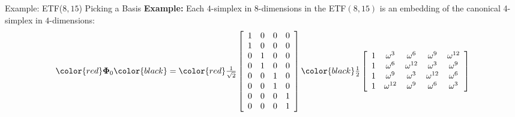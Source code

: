 \documentclass[12pt]{beamer}
\newcommand{\bfPhi}{\boldsymbol{\Phi}}
\begin{document}
\begin{frame}{Example: ETF($8,15$) Picking a Basis}
\textbf{Example:} Each $4$-simplex in $8$-dimensions in the ETF$(8,15)$ is an embedding of the canonical 4-simplex in $4$-dimensions:
\begin{equation*}
\color{red}
\bfPhi_0
\color{black}
=
\color{red}
\tfrac{1}{\sqrt{2}}\left[\begin{array}{cccc}
	1 & 0 & 0 & 0\\
	1 & 0 & 0 & 0\\
	0 & 1 & 0 & 0\\
	0 & 1 & 0 & 0\\
	0 & 0 & 1 & 0\\
	0 & 0 & 1 & 0\\
	0 & 0 & 0 & 1\\
	0 & 0 & 0 & 1
	\end{array}\right]
	\color{black}
	\tfrac{1}{2}\left[\begin{array}{ccccc}
    1 & \omega^{3} &\omega^{6} &\omega^{9} & \omega^{12}\\
    1 & \omega^{6} &\omega^{12} &\omega^{3} & \omega^{9}\\
    1 & \omega^{9} &\omega^{3} &\omega^{12} & \omega^{6}\\
    1 & \omega^{12} &\omega^{9} &\omega^{6} & \omega^{3}\\
    \end{array}\right]
\end{equation*}


\end{frame}
\end{document}
